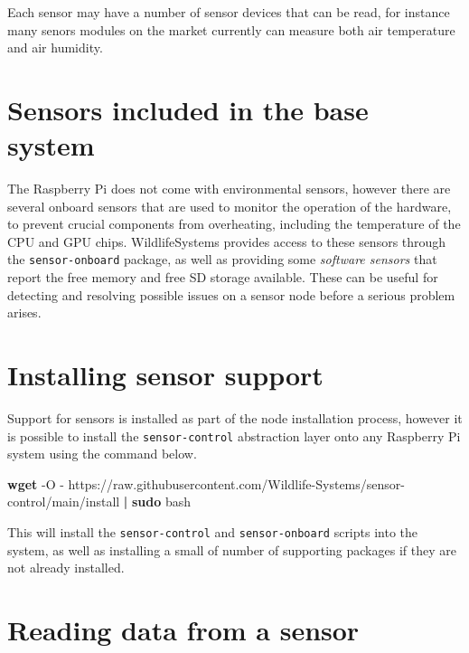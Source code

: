 \documentclass[
]{book}
\newenvironment{Shaded}{\begin{snugshade}}{\end{snugshade}}
\newcommand{\AttributeTok}[1]{\textcolor[rgb]{0.13,0.29,0.53}{#1}}
\newcommand{\FunctionTok}[1]{\textcolor[rgb]{0.13,0.29,0.53}{\textbf{#1}}}
\newcommand{\KeywordTok}[1]{\textcolor[rgb]{0.13,0.29,0.53}{\textbf{#1}}}
\newcommand{\NormalTok}[1]{#1}
\begin{document}
Each sensor may have a number of sensor devices that can be read, for instance many senors modules on the market currently can measure both air temperature and air humidity.

\hypertarget{sensors-included-in-the-base-system}{%
\section{Sensors included in the base system}\label{sensors-included-in-the-base-system}}

The Raspberry Pi does not come with environmental sensors, however there are several onboard sensors that are used to monitor the operation of the hardware, to prevent crucial components from overheating, including the temperature of the CPU and GPU chips. WildlifeSystems provides access to these sensors through the \texttt{sensor-onboard} package, as well as providing some \emph{software sensors} that report the free memory and free SD storage available. These can be useful for detecting and resolving possible issues on a sensor node before a serious problem arises.

\hypertarget{installing-sensor-support}{%
\section{Installing sensor support}\label{installing-sensor-support}}

Support for sensors is installed as part of the node installation process, however it is possible to install the \texttt{sensor-control} abstraction layer onto any Raspberry Pi system using the command below.

\begin{Shaded}
\begin{Highlighting}[]
\FunctionTok{wget} \AttributeTok{{-}O} \AttributeTok{{-}}\NormalTok{ https://raw.githubusercontent.com/Wildlife{-}Systems/sensor{-}control/main/install }\KeywordTok{|} \FunctionTok{sudo}\NormalTok{ bash}
\end{Highlighting}
\end{Shaded}

This will install the \texttt{sensor-control} and \texttt{sensor-onboard} scripts into the system, as well as installing a small of number of supporting packages if they are not already installed.

\hypertarget{reading-data-from-a-sensor}{%
\section{Reading data from a sensor}\label{reading-data-from-a-sensor}}
\end{document}
